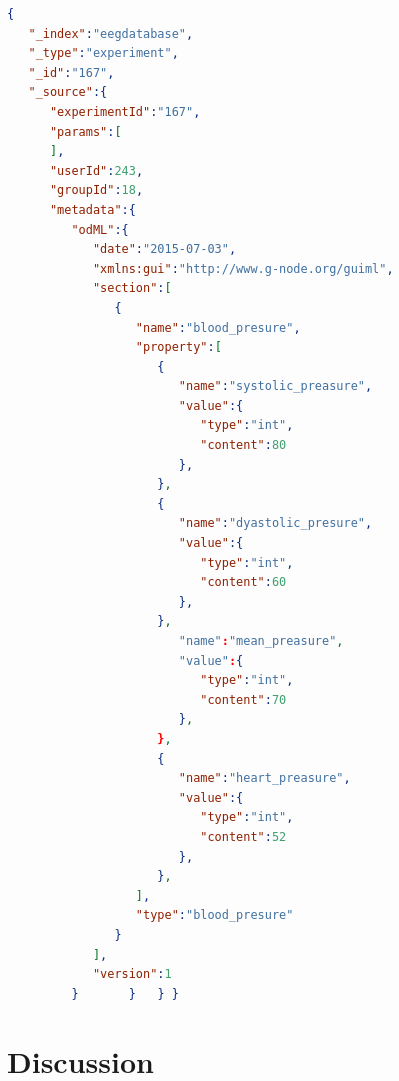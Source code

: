 \documentclass[a4paper,twoside]{article}
\begin{document}
\begin{lstlisting}[language=json,caption=blood preasure examle, label=odml_example]
{
   "_index":"eegdatabase",
   "_type":"experiment",
   "_id":"167",
   "_source":{
      "experimentId":"167",
      "params":[
      ],
      "userId":243,
      "groupId":18,
      "metadata":{
         "odML":{
            "date":"2015-07-03",
            "xmlns:gui":"http://www.g-node.org/guiml",
            "section":[
               {
                  "name":"blood_presure",
                  "property":[
                     {
                        "name":"systolic_preasure",
                        "value":{
                           "type":"int",
                           "content":80
                        },
                     },
                     {
                        "name":"dyastolic_presure",
                        "value":{
                           "type":"int",
                           "content":60
                        },
                     },
                        "name":"mean_preasure",
                        "value":{
                           "type":"int",
                           "content":70
                        },
                     },
                     {
                        "name":"heart_preasure",
                        "value":{
                           "type":"int",
                           "content":52
                        },
                     },
                  ],
                  "type":"blood_presure"
               }
            ],
            "version":1
         }       }   } }
\end{lstlisting}


\section{Discussion}
\label{discussion}
\noindent
\end{document}
